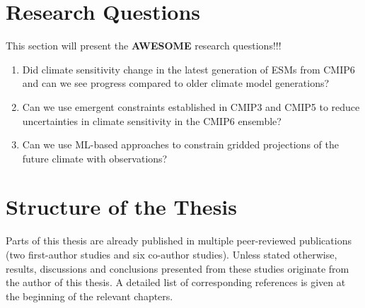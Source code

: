 \section{Research Questions}
\label{sec:01:research_questions}

This section will present the \textbf{AWESOME} research questions!!!

\begin{enumerate}
  \item Did climate sensitivity change in the latest generation of \acp{ESM} from \acs{CMIP}6 and can we see progress compared to older climate
  model generations?

  \item Can we use emergent constraints established in \acs{CMIP}3 and
  \acs{CMIP}5 to reduce uncertainties in climate sensitivity in the \acs{CMIP}6
  ensemble?

  \item Can we use \ac{ML}-based approaches to constrain gridded projections of
  the future climate with observations?
\end{enumerate}


\section{Structure of the Thesis}
\label{sec:01:structure}

Parts of this thesis are already published in multiple peer-reviewed
publications (two first-author studies and six co-author studies). Unless
stated otherwise, results, discussions and conclusions presented from these
studies originate from the author of this thesis. A detailed list of
corresponding references is given at the beginning of the relevant chapters.

